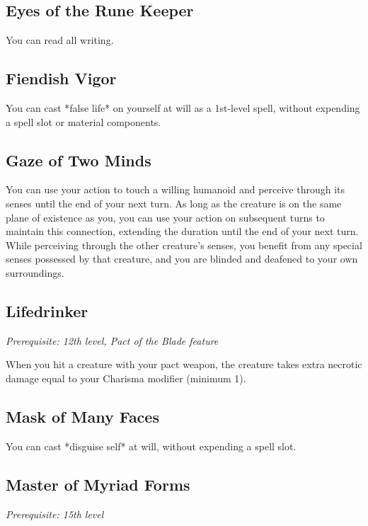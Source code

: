 \subsection{Eyes of the Rune Keeper}

You can read all writing.

\subsection{Fiendish Vigor}

You can cast *false life* on yourself at will as a 1st-level spell, without expending a spell slot or material components.

\subsection{Gaze of Two Minds}

You can use your action to touch a willing humanoid and perceive through its senses until the end of your next turn. As long as the creature is on the same plane of existence as you, you can use your action on subsequent turns to maintain this connection, extending the duration until the end of your next turn. While perceiving through the other creature’s senses, you benefit from any special senses possessed by that creature, and you are blinded and deafened to your own surroundings.

\subsection{Lifedrinker}

\textit{Prerequisite: 12th level, Pact of the Blade feature}

When you hit a creature with your pact weapon, the creature takes extra necrotic damage equal to your Charisma modifier (minimum 1).

\subsection{Mask of Many Faces}

You can cast *disguise self* at will, without expending a spell slot.

\subsection{Master of Myriad Forms}

\textit{Prerequisite: 15th level}

